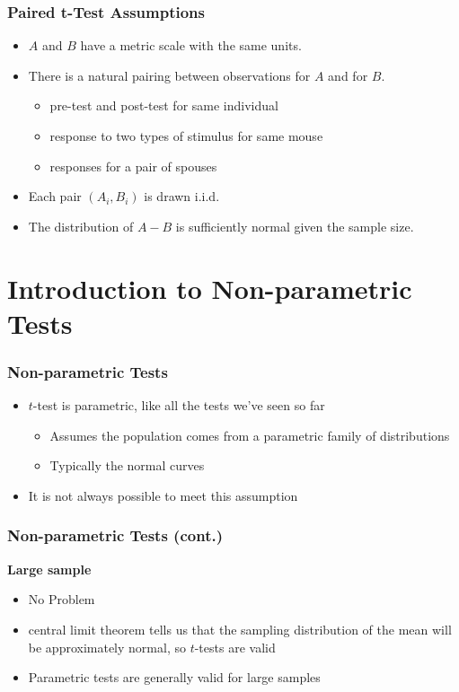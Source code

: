 \documentclass[12pt, block=fill]{beamer}
\begin{document}
\begin{frame}
  \frametitle{Paired t-Test Assumptions}

  \begin{itemize}
  \item $A$ and $B$ have a metric scale with the same units.
  \item There is a natural pairing between observations for $A$ and for $B$.
    \begin{itemize}
    \item pre-test and post-test for same individual
    \item response to two types of stimulus for same mouse
    \item responses for a pair of spouses
    \end{itemize}
  \item Each pair $(A_i, B_i)$ is drawn i.i.d.
  \item The distribution of $A-B$ is sufficiently normal given the sample size.

  \end{itemize}
\end{frame}



\section{Introduction to Non-parametric Tests}

\begin{frame}
  \frametitle{Non-parametric Tests}
  
  \begin{itemize}
    \item $t$-test is parametric, like all the tests we've seen so far
    \begin{itemize}
      \item Assumes the population comes from a parametric family of distributions
      \item Typically the normal curves
    \end{itemize}
    \item It is not always possible to meet this assumption
  \end{itemize}
  
\end{frame}


\begin{frame}
  \frametitle{Non-parametric Tests (cont.)}    

  \textbf{Large sample} 
  \begin{itemize}
    \item No Problem
    \item central limit theorem tells us that the sampling distribution of the mean will be approximately normal, so $t$-tests are valid
    \item Parametric tests are generally valid for large samples
  \end{itemize}

\end{frame}
\end{document}
